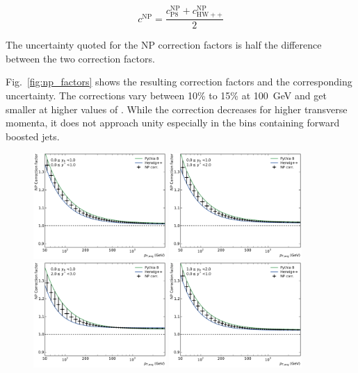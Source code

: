 \begin{equation*}
    c^\mathrm{NP} = \frac{c_{\mathrm{P8}}^{\mathrm{NP}} + c_{\mathrm{HW++}}^{\mathrm{NP}}}{2}
\end{equation*}

The uncertainty quoted for the NP correction factors is half the difference
between the two correction factors.

Fig.~\ref{fig:np_factors} shows the resulting correction factors and the
corresponding uncertainty. The corrections vary between 10\% to 15\% at
\SI{100}{\GeV} and get smaller at higher values of \ptavg. While the correction
decreases for higher transverse momenta, it does not approach unity especially
in the bins containing forward boosted jets. 

\begin{figure}[htp]
    \centering
    \includegraphics[width=0.45\textwidth]{figures/theory/np_factors_calc_yb0ys0.pdf}\hfill
    \includegraphics[width=0.45\textwidth]{figures/theory/np_factors_calc_yb0ys1.pdf}
    \includegraphics[width=0.45\textwidth]{figures/theory/np_factors_calc_yb0ys2.pdf}\hfill
    \includegraphics[width=0.45\textwidth]{figures/theory/np_factors_calc_yb1ys0.pdf}

\end{figure}
